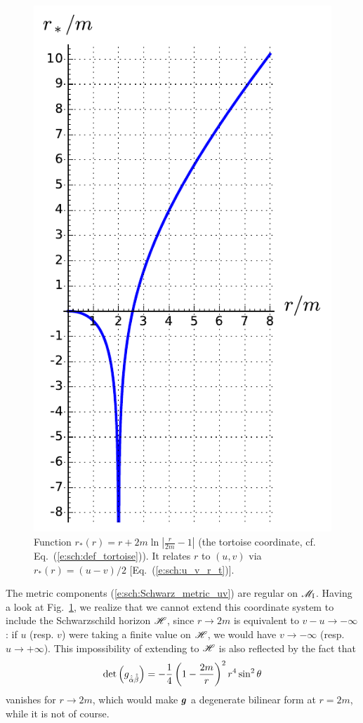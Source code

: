 \begin{figure}
\centerline{\includegraphics[height=0.4\textheight]{max_tortoise.pdf}}
\caption[]{\label{f:sch:tortoise} \footnotesize
Function $r_*(r) = r + 2 m \ln \left| \frac{r}{2m} - 1 \right|$
(the tortoise coordinate, cf. Eq.~(\ref{e:sch:def_tortoise})).
It relates $r$ to $(u,v)$ via $r_*(r) = (u-v)/2$ [Eq.~(\ref{e:sch:u_v_r_t})].}
\end{figure}

The metric components (\ref{e:sch:Schwarz_metric_uv}) are regular on $\mathscr{M}_{\rm I}$.
Having a look at Fig.~\ref{f:sch:tortoise}, we realize that we cannot extend
this coordinate system to include the Schwarzschild horizon $\mathscr{H}$, since
$r\rightarrow 2m$ is equivalent to $v-u\rightarrow -\infty$: if $u$ (resp. $v$)
were taking a finite value on $\mathscr{H}$, we would have $v\rightarrow -\infty$
(resp. $u\rightarrow +\infty$). This impossibility of extending to $\mathscr{H}$
is also reflected by the fact that
\[
    \det \left( g_{\hat{\hat{\alpha}}\hat{\hat{\beta}}} \right) =
        - \frac{1}{4} \left( 1 - \frac{2 m}{r} \right) ^2 r^4 \sin^2\theta
\]
vanishes for $r\rightarrow 2m$, which would make $\bm{g}$ a degenerate bilinear
form at $r=2m$, while it is not of course.

